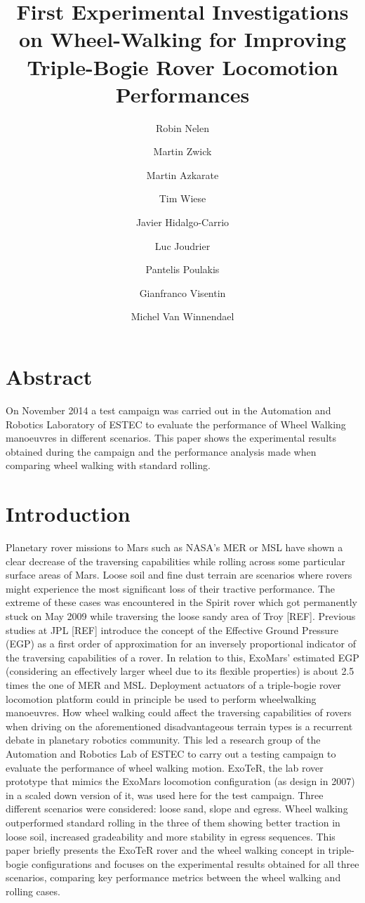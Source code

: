 \documentclass[a4paper,twocolumn]{esapub2005} %
\title{First Experimental Investigations on Wheel-Walking for Improving Triple-Bogie Rover Locomotion Performances}
\author{Robin Nelen}
\author{Martin Zwick}
\author{Martin Azkarate}
\author{Tim Wiese}
\author{Javier Hidalgo-Carrio}
\author{Luc Joudrier}
\author{Pantelis Poulakis}
\author{Gianfranco Visentin}
\author{Michel Van Winnendael}
\affil{European Space Agency, ESA, Noordwijk, The Netherlands}
\affil{Technische Universit\"at M\"unchen, TUM, Munich, Germany}
\affil{Robotics Innovation Center, DFKI, Bremen, Germany}
\begin{document}

\maketitle

\section*{Abstract}
On November 2014 a test campaign was carried out in the Automation and Robotics
Laboratory of ESTEC to evaluate the performance of Wheel Walking manoeuvres in
different scenarios. This paper shows the experimental results obtained during
the campaign and the performance analysis made when comparing wheel walking
with standard rolling.


\section{Introduction}
Planetary rover missions to Mars such as NASA’s MER or MSL have shown a clear
decrease of the traversing capabilities while rolling across some particular
surface areas of Mars. Loose soil and fine dust terrain are scenarios where
rovers might experience the most significant loss of their tractive
performance. The extreme of these cases was encountered in the Spirit rover
which got permanently stuck on May 2009 while traversing the loose sandy area
of Troy {\color{red} [REF]}. Previous studies at JPL
{\color{red} [REF]} introduce the concept of the Effective Ground
Pressure (EGP) as a first order of approximation for an inversely proportional
indicator of the traversing capabilities of a rover. In relation to this,
ExoMars’ estimated EGP (considering an effectively larger wheel due to its
flexible properties) is about 2.5 times the one of MER and MSL.  Deployment
actuators of a triple-bogie rover locomotion platform could in principle be
used to perform wheelwalking manoeuvres.  How wheel walking could affect the
traversing capabilities of rovers when driving on the aforementioned
disadvantageous terrain types is a recurrent debate in planetary robotics
community.  This led a research group of the Automation and Robotics Lab of
ESTEC to carry out a testing campaign to evaluate the performance of wheel
walking motion. ExoTeR, the lab rover prototype that mimics the ExoMars
locomotion configuration (as design in 2007) in a scaled down version of it,
was used here for the test campaign. Three different scenarios were considered:
loose sand, slope and egress. Wheel walking outperformed standard rolling in
the three of them showing better traction in loose soil, increased gradeability
and more stability in egress sequences.  This paper briefly presents the ExoTeR
rover and the wheel walking concept in triple-bogie configurations and focuses
on the experimental results obtained for all three scenarios, comparing key
performance metrics between the wheel walking and rolling cases.
\end{document}
